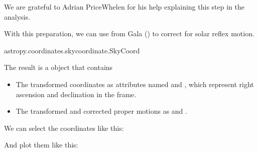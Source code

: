 \documentclass[letterpaper,10pt,english]{sphinxmanual}
\begin{document}
We are grateful to Adrian Price\sphinxhyphen{}Whelen for his help explaining this step in the analysis.

With this preparation, we can use  from Gala () to correct for solar reflex motion.

\begin{sphinxVerbatim}[commandchars=\\\{\}]
  

\end{sphinxVerbatim}

\begin{sphinxVerbatim}[commandchars=\\\{\}]
astropy.coordinates.sky\PYGZus{}coordinate.SkyCoord
\end{sphinxVerbatim}

The result is a  object that contains
\begin{itemize}
\item {} 
The transformed coordinates as attributes named  and , which represent right ascension and declination in the  frame.

\item {} 
The transformed and corrected proper motions as  and .

\end{itemize}

We can select the coordinates like this:

\begin{sphinxVerbatim}[commandchars=\\\{\}]
  
  
\end{sphinxVerbatim}

And plot them like this:

\begin{sphinxVerbatim}[commandchars=\\\{\}]
    

\end{sphinxVerbatim}
\end{document}
